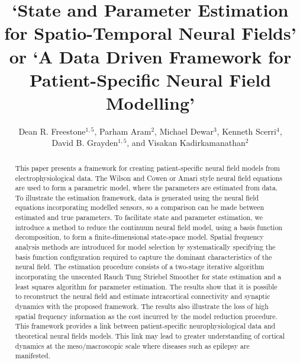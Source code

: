 \documentclass[10pt,a4paper]{article}
\begin{document}
\title{`State and Parameter Estimation for Spatio-Temporal Neural Fields' or `A Data Driven Framework for Patient-Specific Neural Field Modelling'}

\author{Dean R. Freestone$^{1,5}$, Parham Aram$^2$, Michael Dewar$^3$, Kenneth Scerri$^4$, \\David B. Grayden$^{1,5}$, and Visakan Kadirkamanathan$^2$}


\maketitle

\begin{abstract}
	This paper presents a framework for creating patient-specific neural field models from electrophysiological data. The Wilson and Cowen or Amari style neural field equations are used to form a parametric model, where the parameters are estimated from data. To illustrate the estimation framework, data is generated using the neural field equations incorporating modelled sensors, so a comparison can be made between estimated and true parameters. To facilitate state and parameter estimation, we introduce a method to reduce the continuum neural field model, using a basis function decomposition, to form a finite-dimensional state-space model. Spatial frequency analysis methods are introduced for model selection by systematically specifying the basis function configuration required to capture the dominant characteristics of the neural field. The estimation procedure consists of a two-stage iterative algorithm incorporating the unscented Rauch Tung Striebel Smoother for state estimation and a least squares algorithm for parameter estimation. The results show that it is possible to reconstruct the neural field and estimate intracortical connectivity and synaptic dynamics with the proposed framework. The results also illustrate the loss of high spatial frequency information as the cost incurred by the model reduction procedure. This framework provides a link between patient-specific neurophysiological data and theoretical neural fields models. This link may lead to greater understanding of cortical dynamics at the meso/macroscopic scale where diseases such as epilepsy are manifested.   
\end{abstract}
\end{document}
